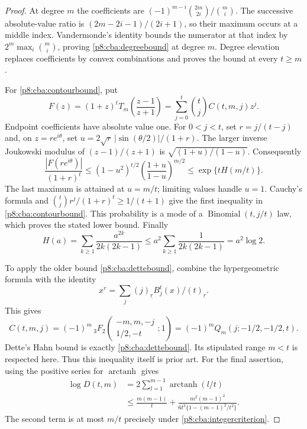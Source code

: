 \documentclass[11pt,a4paper]{article}
\theoremstyle{definition}
\theoremstyle{remark}
\numberwithin{equation}{section}
\begin{document}
\begin{proof}
At degree $m$ the coefficients are
$(-1)^{m-i}\binom{2m}{2i}/\binom mi$. The successive absolute-value ratio
is $(2m-2i-1)/(2i+1)$, so their maximum occurs at a middle index.
Vandermonde's identity bounds the numerator at that index by
$2^m\max_i\binom mi$, proving \eqref{p8:cba:degreebound} at degree $m$.
Degree elevation replaces coefficients by convex combinations and proves
the bound at every $t\ge m$.

For \eqref{p8:cba:contourbound}, put
\[
 F(z)=(1+z)^tT_m\left(\frac{z-1}{z+1}\right)
     =\sum_{j=0}^t\binom tj C(t,m,j)z^j.
\]
Endpoint coefficients have absolute value one. For $0<j<t$, set
$r=j/(t-j)$ and, on $z=re^{i\theta}$, set
$u=2\sqrt r\,|\sin(\theta/2)|/(1+r)$. The larger inverse Joukowski
modulus of $(z-1)/(z+1)$ is
$\sqrt{(1+u)/(1-u)}$. Consequently
\[
 \frac{|F(re^{i\theta})|}{(1+r)^t}
 \le(1-u^2)^{t/2}
          \left(\frac{1+u}{1-u}\right)^{m/2}
 \le \exp\{tH(m/t)\}.
\]
The last maximum is attained at $u=m/t$; limiting values handle $u=1$.
Cauchy's formula and
$\binom tj r^j/(1+r)^t\ge1/(t+1)$ give the first inequality in
\eqref{p8:cba:contourbound}. This probability is a mode of a
$\operatorname{Binomial}(t,j/t)$ law, which proves the stated lower bound.
Finally
\[
 H(a)=\sum_{k\ge1}\frac{a^{2k}}{2k(2k-1)}
       \le a^2\sum_{k\ge1}\frac1{2k(2k-1)}=a^2\log2.
\]

To apply the older bound \eqref{p8:cba:dettebound}, combine the
hypergeometric formula with the identity
\[
 x^r=\sum_j(j)_{\underline r}B_j^t(x)/(t)_{\underline r}.
\]
This gives
\[
 C(t,m,j)=(-1)^m\,{}_3F_2
       \left(\begin{matrix}-m,m,-j\\1/2,-t\end{matrix};1\right)
       =(-1)^mQ_m(j;-1/2,-1/2,t).
\]
Dette's Hahn bound \cite[Corollary~3.6(b)]{p8:CB_Dette} is exactly
\eqref{p8:cba:dettebound}. Its stipulated range $m<t$ is respected here.
Thus this inequality itself is prior art. For the final assertion,
using the positive series for $\operatorname{arctanh}$ gives
\begin{align*}
 \log D(t,m)
 &=2\sum_{l=1}^{m-1}\operatorname{arctanh}(l/t)\\
 &\le \frac{m(m-1)}t+
 \frac{m^2(m-1)^2}
 {6t^3\{1-(m-1)^2/t^2\}}.
\end{align*}
The second term is at most $m/t$ precisely under
\eqref{p8:cba:integercriterion}.
\end{proof}
\end{document}
